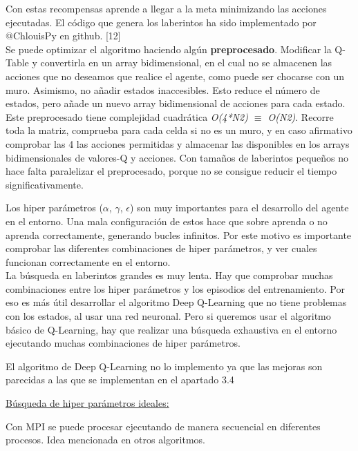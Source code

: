 	Con estas recompensas aprende a llegar a la meta minimizando las acciones ejecutadas. El código que genera los laberintos ha sido implementado por @ChlouisPy en github. [12]\\
	
	
	Se puede optimizar el algoritmo haciendo algún \textbf{preprocesado}.
	Modificar la Q-Table y convertirla en un array bidimensional, en el cual no se almacenen las acciones que no deseamos que realice el agente, como puede ser chocarse con un muro. Asimismo, no añadir estados inaccesibles. Esto reduce el número de estados, pero añade un nuevo array bidimensional de acciones para cada estado. Este preprocesado tiene complejidad cuadrática \textit{O(4*N2) $\equiv$ O(N2)}. Recorre toda la matriz, comprueba para cada celda si no es un muro, y en caso afirmativo comprobar las 4 las acciones permitidas y almacenar las disponibles en los arrays bidimensionales  de valores-Q y acciones. Con tamaños de laberintos pequeños no hace falta paralelizar el preprocesado, porque no se consigue reducir el tiempo significativamente.
	
	Los hiper parámetros ($\alpha$, $\gamma$, $\epsilon$) son muy importantes para el desarrollo del agente en el entorno. Una mala configuración de estos hace que sobre aprenda o no aprenda correctamente, generando bucles infinitos. Por este motivo es importante comprobar las diferentes combinaciones de hiper parámetros, y ver cuales funcionan correctamente en el entorno.\\
	
	La búsqueda en laberintos grandes es muy lenta. Hay que comprobar muchas combinaciones entre los hiper parámetros y los episodios del entrenamiento. Por eso es más útil desarrollar el algoritmo Deep Q-Learning que no tiene problemas con los estados, al usar una red neuronal. Pero si queremos usar el algoritmo básico de Q-Learning, hay que realizar una búsqueda exhaustiva en el entorno ejecutando muchas  combinaciones de hiper parámetros.
	
	\color{red}El algoritmo de Deep Q-Learning no lo implemento ya que las mejoras son parecidas a las que se implementan en el apartado 3.4
	\color{black}
	
	\begin{flushleft}
		\underline{Búsqueda de hiper parámetros ideales:	}
	\end{flushleft}
	Con MPI se puede procesar ejecutando de manera secuencial en diferentes procesos. Idea mencionada en otros algoritmos. 
	
